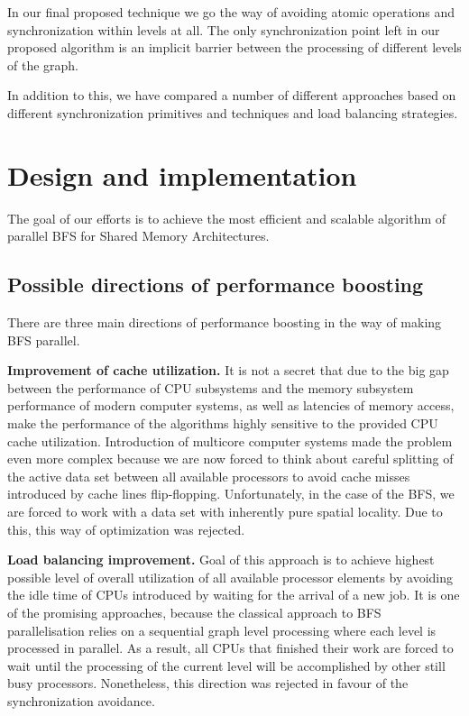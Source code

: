 \documentclass[letterpaper]{article}
\begin{document}
	
		In our final proposed technique we go the way of avoiding atomic operations and synchronization within levels at all.
		The only synchronization point left in our proposed algorithm is an implicit barrier between the processing of different levels of the graph.
		
		In addition to this, we have compared a number of different approaches based on different synchronization primitives and techniques and load balancing strategies.

	
	
	\section{Design and implementation}\label{sec:deim} %
		The goal of our efforts is to achieve the most efficient and scalable algorithm of parallel BFS for Shared Memory Architectures. 

		\subsection{Possible directions of performance boosting}
			There are three main directions of performance boosting in the way of making BFS parallel.
			
			\textbf{Improvement of cache utilization.}
			It is not a secret that due to the big gap between the performance of CPU subsystems and the memory subsystem performance of modern computer systems, as well as latencies of memory access, make the performance of the algorithms highly sensitive to the provided CPU cache utilization. 
			Introduction of multicore computer systems made the problem even more complex because  we are now forced to think about careful splitting of the active data set between all available processors to avoid cache misses introduced by cache lines flip-flopping. 
			Unfortunately, in the case of the BFS, we are forced to work with a data set with inherently pure spatial locality. 
			Due to this, this way of optimization was rejected.
			
			\textbf{Load balancing improvement.} 
			Goal of this approach is to achieve highest possible level of overall utilization of all available processor elements by avoiding the idle time of CPUs introduced by waiting for the arrival of a new job.
			It is one of the promising approaches, because the classical approach to BFS parallelisation relies on a sequential graph level processing where each level is processed in parallel.
			As a result, all CPUs that finished their work are forced to wait until the processing of the current level will be accomplished by other still busy processors.
			Nonetheless, this direction was rejected in favour of the synchronization avoidance. 
			
\end{document}
